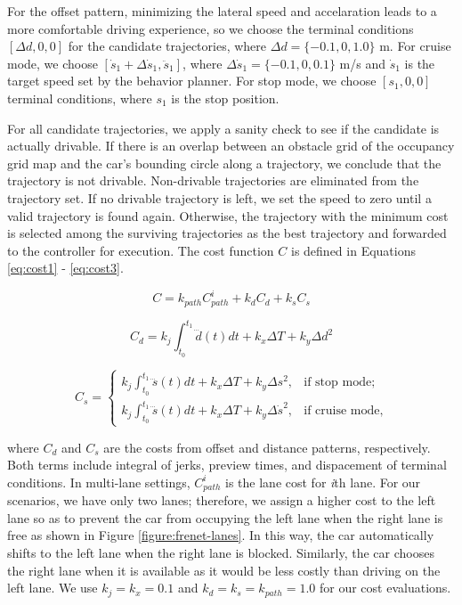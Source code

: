 For the offset pattern, minimizing the lateral speed and accelaration leads to
a more comfortable driving experience, so  we choose the terminal conditions
$[\Delta d, 0, 0]$ for the candidate trajectories, where $\Delta d = \{-0.1, 0,
1.0\}$ m. For cruise mode, we choose $[\dot{s}_1 + \Delta \dot{s}_1,
\ddot{s}_1]$, where $\Delta \dot{s}_1 = \{-0.1, 0, 0.1\}$ m/s and $\dot{s}_1$
is the target speed set by the behavior planner. For stop mode, we choose
$[s_1, 0, 0]$ terminal conditions, where $s_1$ is the stop position.

For all candidate trajectories, we apply a sanity check to see if the candidate
is actually drivable. If there is an overlap between an obstacle grid of the
occupancy grid map and the car's bounding circle along a trajectory, we
conclude that the trajectory is not drivable. Non-drivable trajectories are
eliminated from the trajectory set. If no drivable trajectory is left, we set
the speed to zero until a valid trajectory is found again. Otherwise, the
trajectory with the minimum cost is selected among the surviving trajectories
as the best trajectory and forwarded to the controller for execution. The cost
function $C$ is defined in Equations \eqref{eq:cost1} - \eqref{eq:cost3}.

\begin{equation}
  C = k_{path}C^i_{path} + k_dC_d + k_sC_s
\label{eq:cost1}
\end{equation}

\begin{equation}
  C_d = k_j\int_{t_0}^{t_1}\dddot{d}(t)dt + k_x\Delta T + k_y\Delta d^2
\label{eq:cost2}
\end{equation}

\begin{equation}
  C_s =
  \begin{cases}
    k_j\int_{t_0}^{t_1}\dddot{s}(t)dt + k_x\Delta T + k_y\Delta s^2,
    &\text{if stop mode;} \\
    k_j\int_{t_0}^{t_1}\dddot{s}(t)dt + k_x\Delta T + k_y\Delta \dot{s}^2,
    &\text{if cruise mode,}
  \end{cases}
  \label{eq:cost3}
\end{equation}

where $C_d$ and $C_s$ are the costs from offset and distance patterns,
respectively. Both terms include integral of jerks, preview times, and
dispacement of terminal conditions. In multi-lane settings, $C^i_{path}$ is the
lane cost for \textit{i}th lane. For our scenarios, we have only two lanes;
therefore, we assign a higher cost to the left lane so as to prevent the car
from occupying the left lane when the right lane is free as shown in Figure
\ref{figure:frenet-lanes}. In this way, the car automatically shifts to the
left lane when the right lane is blocked. Similarly, the car chooses the right
lane when it is available as it would be less costly than driving on the left
lane. We use $k_j = k_x = 0.1$ and $k_d = k_s = k_{path} = 1.0$ for our cost
evaluations.

